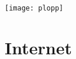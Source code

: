  \begin{center}
   \texttt{[image: plopp]}\\
   \stPloppDrawingSessionTerm
 \end{center}


\begin{stGlossary}
\end{stGlossary}

\pagebreak{}

\section{\stBooksTerm}

\stBooksDefinition

\section{\stSmalltalkActionsTerm}

\stSmalltalkActionsDefinition

\section{Internet}

\stInternetWebsitesDefinition

